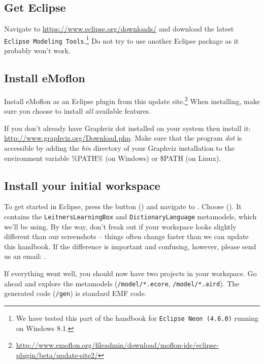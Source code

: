 
\subsection{Get Eclipse}
\label{sec:get-eclipse}

Navigate to \url{https://www.eclipse.org/downloads/} and download the latest \texttt{Eclipse Modeling Tools}.\footnote{We have tested this part of the handbook for \texttt{Eclipse Neon (4.6.0)} running on Windows 8.1.}
Do not try to use another Eclipse package as it probably won't work.

\subsection{Install eMoflon}
\label{sec:get-emoflon}

Install eMoflon as an Eclipse plugin from this update site.\footnote{\url{http://www.emoflon.org/fileadmin/download/moflon-ide/eclipse-plugin/beta/update-site2/}}
When installing, make sure you choose to install \emph{all} available features.

If you don't already have Graphviz dot installed on your system then install it:
\url{http://www.graphviz.org/Download.php}.
Make sure that the program \emph{dot} is accessible by adding the \emph{bin} directory of your Graphviz installation to the environment variable \%PATH\% (on Windows) or \$PATH (on Linux).

\subsection{Install your initial workspace}
\label{sec:loadSourceMeta}

To get started in Eclipse, press the  button (\eMoflonMenuButton) and navigate to .
Choose  (). 
It contains the \texttt{Leitners\-Learning\-Box} and \texttt{Dictionary\-Language} metamodels, which we'll be using. 
By the way, don't freak out if your workspace looks slightly different than our screenshots -- things often change faster than we can update this handbook.
If the difference is important and confusing, however, please send us an email:  \emoflonMail.

If everything went well, you should now have two projects in your workspace.  
Go ahead and explore the metamodels (\texttt{/model/*.ecore}, \texttt{/model/*.aird}).
The generated code (\texttt{/gen}) is standard EMF code.


